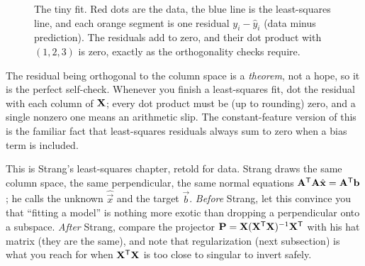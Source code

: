\begin{figure}[htbp]
\centering
{}
\caption{The tiny fit. Red dots are the data, the blue line is the least-squares line,
and each orange segment is one residual $y_i-\hat y_i$ (data minus prediction). The
residuals add to zero, and their dot product with $(1,2,3)$ is zero, exactly as the
orthogonality checks require.}
\label{ch34:fig-tinyfit}
\end{figure}

\begin{trapbox}
The residual being orthogonal to the column space is a \emph{theorem}, not a hope, so it
is the perfect self-check. Whenever you finish a least-squares fit, dot the residual with
each column of $\mathbf{X}$; every dot product must be (up to rounding) zero, and a single
nonzero one means an arithmetic slip. The
constant-feature version of this is the familiar fact that least-squares residuals always
sum to zero when a bias term is included.
\end{trapbox}

\begin{strangbox}
This is Strang's least-squares chapter, retold for data. Strang draws the same column
space, the same perpendicular, the same normal equations $\mathbf{A}^{\mathsf{T}}\mathbf{A}\hat{\mathbf{x}}
=\mathbf{A}^{\mathsf{T}}\mathbf{b}$; he calls the unknown $\hat{\vec{x}}$ and the target $\vec{b}$.
\emph{Before} Strang, let this convince you that ``fitting a model'' is nothing more
exotic than dropping a perpendicular onto a subspace. \emph{After} Strang, compare
the projector $\mathbf{P}=\mathbf{X}(\mathbf{X}^{\mathsf{T}}\mathbf{X})^{-1}\mathbf{X}^{\mathsf{T}}$ with his hat matrix (they are
the same), and note that regularization (next subsection) is what you reach for when
$\mathbf{X}^{\mathsf{T}}\mathbf{X}$ is too close to singular to invert safely.
\end{strangbox}

